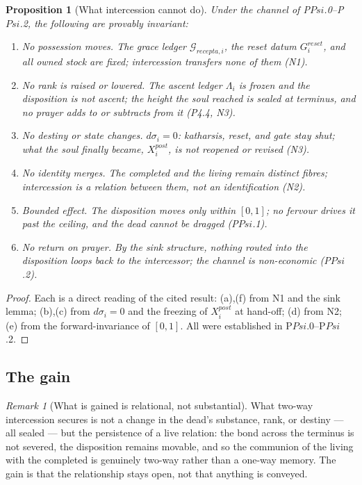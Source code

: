 \documentclass[11pt,a4paper]{article}
\def\Psi{Psi}%
\def\mathrm#1{#1}%
\def\emph#1{#1}%
\theoremstyle{definition}
\theoremstyle{plain}
\newtheorem{proposition}[definition]{Proposition}
\theoremstyle{remark}
\newtheorem{remark}[definition]{Remark}
\begin{document}
\begin{proposition}[What intercession cannot do]\label{prop:limits}
Under the channel of P$\Psi$.0--P$\Psi$.2, the following are provably invariant:
\begin{enumerate}[label=\textup{(\alph*)},leftmargin=1.2cm]
\item \emph{No possession moves.} The grace ledger \(\mathcal G_{\mathrm{recepta},i}\), the reset
datum \(G_i^{\mathrm{reset}}\), and all owned stock are fixed; intercession transfers none of
them (N1).
\item \emph{No rank is raised or lowered.} The ascent ledger \(\Lambda_i\) is frozen and the
disposition is not ascent; the height the soul reached is sealed at terminus, and no prayer
adds to or subtracts from it (P4.4, N3).
\item \emph{No destiny or state changes.} \(d\sigma_i=0\): katharsis, reset, and gate stay
shut; what the soul finally became, \(X_i^{\mathrm{post}}\), is not reopened or revised (N3).
\item \emph{No identity merges.} The completed and the living remain distinct fibres;
intercession is a relation between them, not an identification (N2).
\item \emph{Bounded effect.} The disposition moves only within \([0,1]\); no fervour drives it
past the ceiling, and the dead cannot be dragged (P$\Psi$.1).
\item \emph{No return on prayer.} By the sink structure, nothing routed into the disposition
loops back to the intercessor; the channel is non-economic (P$\Psi$.2).
\end{enumerate}
\end{proposition}

\begin{proof}
Each is a direct reading of the cited result: (a),(f) from N1 and the sink lemma; (b),(c) from
\(d\sigma_i=0\) and the freezing of \(X_i^{\mathrm{post}}\) at hand-off; (d) from N2; (e) from
the forward-invariance of \([0,1]\). All were established in P$\Psi$.0--P$\Psi$.2. \qedhere
\end{proof}

\subsection{The gain}

\begin{remark}[What is gained is relational, not substantial]\label{rem:gain}
What two-way intercession secures is not a change in the dead's substance, rank, or destiny ---
all sealed --- but the persistence of a \emph{live relation}: the bond across the terminus is
not severed, the disposition remains movable, and so the communion of the living with the
completed is genuinely two-way rather than a one-way memory. The gain is that the relationship
stays open, not that anything is conveyed.
\end{remark}
\end{document}
